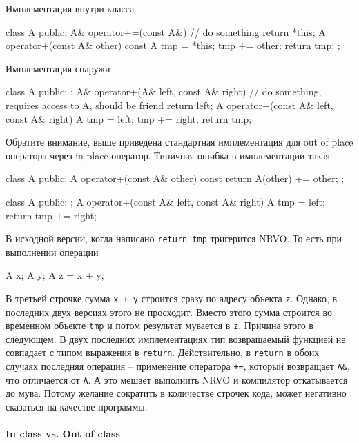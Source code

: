 Имплементация внутри класса
\begin{cppcode}
class A {
public:
  A& operator+=(const A&) {
    // do something
    return *this;
  }
  A operator+(const A& other) const {
    A tmp = *this;
    tmp += other;
    return tmp;
  }
};
\end{cppcode}
Имплементация снаружи
\begin{cppcode}
class A {
public:
};
A& operator+(A& left, const A& right) {
  // do something, requires access to A, should be friend
  return left;
}
A operator+(const A& left, const A& right) {
  A tmp = left;
  tmp += right;
  return tmp;
}
\end{cppcode}
Обратите внимание, выше приведена стандартная имплементация для out of place оператора через in place оператор.
Типичная ошибка в имплементации такая
\begin{cppcode}
class A {
public:
  A operator+(const A& other) const {
    return A(other) += other;
  }
};

class A {
public:
};
A operator+(const A& left, const A& right) {
  A tmp = left;
  return tmp += right;
}
\end{cppcode}
В исходной версии, когда написано \verb"return tmp" тригерится NRVO.
То есть при выполнении операции
\begin{cppcode}
A x;
A y;
A z = x + y;
\end{cppcode}
В третьей строчке сумма \verb"x + y" строится сразу по адресу объекта \verb"z".
Однако, в последних двух версиях этого не просходит.
Вместо этого сумма строится во временном объекте \verb"tmp" и потом результат мувается в \verb"z".
Причина этого в следующем.
В двух последних имплементациях тип возвращаемый функцией не совпадает с типом выражения в \verb"return".
Действительно, в \verb"return" в обоих случаях последняя операция -- применение оператора \verb"+=", который возвращает \verb"A&", что отличается от \verb"A".
А это мешает выполнить NRVO и компилятор откатывается до мува.
Потому желание сократить в количестве строчек кода, может негативно сказаться на качестве программы.

\paragraph{In class vs.
Out of class}

